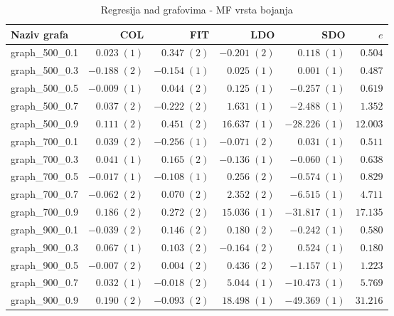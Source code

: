 \documentclass[times, utf8, diplomski, numeric]{fer}
\begin{document}
\begin{table}[!H]
	\caption{Regresija nad grafovima - MF vrsta bojanja}
	\label{tbl:regresija-MF}
	\centering
	\begin{tabular}{|l|r|r|r|r|r|} \hline
	Naziv grafa & COL & FIT & LDO & SDO & $e$ \\ \hline \hline
graph\_500\_0.1 & $ 0.023\; (1) $ & $ 0.347\; (2) $ & $ -0.201\; (2) $ & $ 0.118\; (1) $ & $ 0.504 $\\ \hline
graph\_500\_0.3 & $ -0.188\; (2) $ & $ -0.154\; (1) $ & $ 0.025\; (1) $ & $ 0.001\; (1) $ & $ 0.487 $\\ \hline
graph\_500\_0.5 & $ -0.009\; (1) $ & $ 0.044\; (2) $ & $ 0.125\; (1) $ & $ -0.257\; (1) $ & $ 0.619 $\\ \hline
graph\_500\_0.7 & $ 0.037\; (2) $ & $ -0.222\; (2) $ & $ 1.631\; (1) $ & $ -2.488\; (1) $ & $ 1.352 $\\ \hline
graph\_500\_0.9 & $ 0.111\; (2) $ & $ 0.451\; (2) $ & $ 16.637\; (1) $ & $ -28.226\; (1) $ & $ 12.003 $\\ \hline
graph\_700\_0.1 & $ 0.039\; (2) $ & $ -0.256\; (1) $ & $ -0.071\; (2) $ & $ 0.031\; (1) $ & $ 0.511 $\\ \hline
graph\_700\_0.3 & $ 0.041\; (1) $ & $ 0.165\; (2) $ & $ -0.136\; (1) $ & $ -0.060\; (1) $ & $ 0.638 $\\ \hline
graph\_700\_0.5 & $ -0.017\; (1) $ & $ -0.108\; (1) $ & $ 0.256\; (2) $ & $ -0.574\; (1) $ & $ 0.829 $\\ \hline
graph\_700\_0.7 & $ -0.062\; (2) $ & $ 0.070\; (2) $ & $ 2.352\; (2) $ & $ -6.515\; (1) $ & $ 4.711 $\\ \hline
graph\_700\_0.9 & $ 0.186\; (2) $ & $ 0.272\; (2) $ & $ 15.036\; (1) $ & $ -31.817\; (1) $ & $ 17.135 $\\ \hline
graph\_900\_0.1 & $ -0.039\; (2) $ & $ 0.146\; (2) $ & $ 0.180\; (2) $ & $ -0.242\; (1) $ & $ 0.580 $\\ \hline
graph\_900\_0.3 & $ 0.067\; (1) $ & $ 0.103\; (2) $ & $ -0.164\; (2) $ & $ 0.524\; (1) $ & $ 0.180 $\\ \hline
graph\_900\_0.5 & $ -0.007\; (2) $ & $ 0.004\; (2) $ & $ 0.436\; (2) $ & $ -1.157\; (1) $ & $ 1.223 $\\ \hline
graph\_900\_0.7 & $ 0.032\; (1) $ & $ -0.018\; (2) $ & $ 5.044\; (1) $ & $ -10.473\; (1) $ & $ 5.769 $\\ \hline
graph\_900\_0.9 & $ 0.190\; (2) $ & $ -0.093\; (2) $ & $ 18.498\; (1) $ & $ -49.369\; (1) $ & $ 31.216 $\\ \hline
	\end{tabular}
\end{table} 
\end{document}

